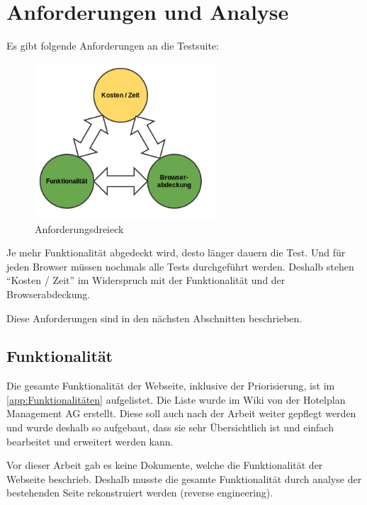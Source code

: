 

\chapter{Anforderungen und Analyse}
\label{sec:analyse}

Es gibt folgende Anforderungen an die Testsuite:
\begin{figure}[H]
	\centering
	\includegraphics[width=0.6\textwidth]{images/triangle.png}
	\caption{Anforderungsdreieck}
	\label{fig:analyse:Anforderungsdreieck}
\end{figure}

Je mehr Funktionalität abgedeckt wird, desto länger dauern die Test. Und für jeden Browser müssen nochmals alle Tests durchgeführt werden. Deshalb stehen "`Kosten / Zeit"' im Widerspruch mit der Funktionalität und der Browserabdeckung.

Diese Anforderungen sind in den nächsten Abschnitten beschrieben.

\section{Funktionalität}
\label{sec:analyse:Funktionalität}
Die gesamte Funktionalität der Webseite, inklusive der Priorisierung, ist im \cref{app:Funktionalitäten}  aufgelistet. Die Liste wurde im Wiki von der Hotelplan Management AG erstellt. Diese soll auch nach der Arbeit weiter gepflegt werden und wurde deshalb so aufgebaut, dass sie sehr Übersichtlich ist und einfach bearbeitet und erweitert werden kann.

Vor dieser Arbeit gab es keine Dokumente, welche die Funktionalität der Webseite beschrieb. Deshalb musste die gesamte Funktionalität durch analyse der bestehenden Seite rekonstruiert werden (reverse engineering).

